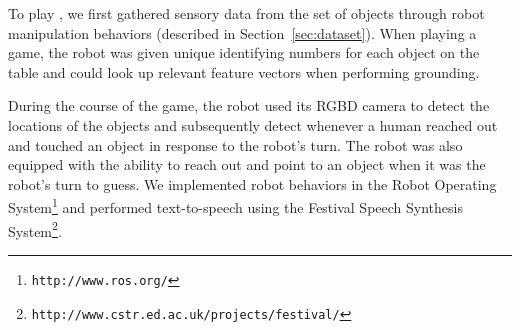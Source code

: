 To play \ispy, we first gathered sensory data from the set of objects through robot manipulation behaviors (described in Section~\ref{sec:dataset}).
When playing a game, the robot was given unique identifying numbers for each object on the table and could look up relevant feature vectors when performing grounding.

During the course of the game, the robot used its RGBD camera to detect the locations of the objects and subsequently detect whenever a human reached out and touched an object in response to the robot's turn.
The robot was also equipped with the ability to reach out and point to an object when it was the robot's turn to guess.
We implemented robot behaviors in the Robot Operating System\footnote{\texttt{http://www.ros.org/}} and performed text-to-speech using the Festival Speech Synthesis System\footnote{\texttt{http://www.cstr.ed.ac.uk/projects/festival/}}.